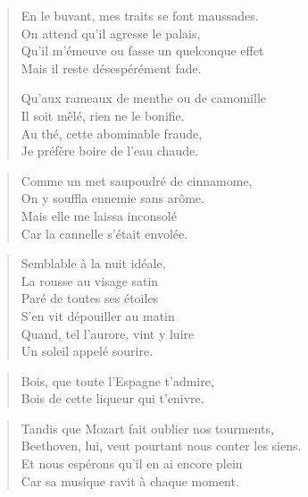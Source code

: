\null
\newpage


\begin{verse}
En le buvant, mes traits se font maussades.\\
On attend qu’il agresse le palais,\\
Qu’il m’émeuve ou fasse un quelconque effet\\
Mais il reste désespérément fade.

Qu’aux rameaux de menthe ou de camomille\\
Il soit mêlé, rien ne le bonifie.\\
Au thé, cette abominable fraude,\\
Je préfère  boire de l’eau chaude.
\end{verse}


\begin{verse}
Comme un met saupoudré de cinnamome,\\
On y souffla ennemie sans arôme.\\
Mais elle me laissa inconsolé\\
Car la cannelle s’était envolée.
\end{verse}

\begin{verse}
Semblable à la nuit idéale,\\
La rousse au visage satin\\
Paré de toutes ses étoiles\\
S’en vit dépouiller au matin\\
Quand, tel l’aurore, vint y luire\\
Un soleil appelé sourire.
\end{verse}

\begin{verse}
Bois, que toute l’Espagne t’admire,\\
Bois de cette liqueur qui t’enivre.
\end{verse}

\begin{verse}
Tandis que Mozart fait oublier nos tourments,\\
Beethoven, lui, veut pourtant nous conter les siens.\\
Et nous espérons qu’il en ai encore plein\\
Car sa musique ravit à chaque moment.
\end{verse}


